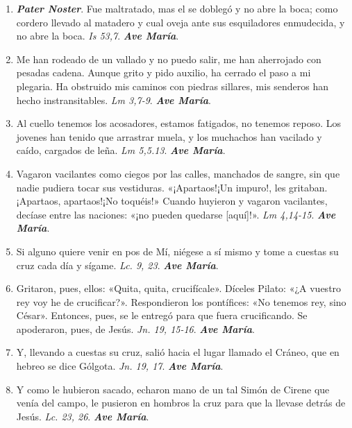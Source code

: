 \documentclass[../../devocionario.tex]{subfiles}
\begin{document}
    \begin{enumerate}
    
        \item \textbf{\textit{Pater Noster}}. Fue maltratado, mas el se doblegó y no abre la boca; como cordero llevado al matadero 
            y cual oveja ante sus esquiladores enmudecida, y no abre la boca. \textit{Is 53,7}. \textbf{\textit{Ave María}}.

        \item Me han rodeado de un vallado y no puedo salir, me han aherrojado con pesadas cadena. Aunque grito y pido auxilio, 
            ha cerrado el paso a mi plegaria. Ha obstruido mis caminos con piedras sillares, 
            mis senderos han hecho instransitables. \textit{Lm 3,7-9}. \textbf{\textit{Ave María}}.

        \item Al cuello tenemos los acosadores, estamos fatigados, no tenemos reposo. Los jovenes han tenido que arrastrar muela, 
            y los muchachos han vacilado y caído, cargados de leña. \textit{Lm 5,5.13}. \textbf{\textit{Ave María}}.

        \item Vagaron vacilantes como ciegos por las calles, manchados de sangre, sin que nadie pudiera tocar sus vestiduras. 
            «¡Apartaos!¡Un impuro!, les gritaban. ¡Apartaos, apartaos!¡No toquéis!» 
            Cuando huyieron y vagaron vacilantes, decíase entre las naciones: «¡no pueden quedarse [aquí]!». \textit{Lm 4,14-15}. \textbf{\textit{Ave María}}.

        \item Si alguno quiere venir en pos de Mí, niégese a sí mismo y tome a cuestas su cruz cada día y sígame. \textit{Lc. 9, 23}. \textbf{\textit{Ave María}}.

        \item Gritaron, pues, ellos: «Quita, quita, crucifícale». Díceles Pilato: «¿A vuestro rey voy he de crucificar?». 
            Respondieron los pontífices: «No tenemos rey, sino César». Entonces, pues, se le entregó para que fuera crucificando. 
            Se apoderaron, pues, de Jesús. \textit{Jn. 19, 15-16}. \textbf{\textit{Ave María}}.

        \item Y, llevando a cuestas su cruz, salió hacia el lugar llamado el Cráneo, que en hebreo se dice Gólgota. \textit{Jn. 19, 17}. \textbf{\textit{Ave María}}.

        \item Y como le hubieron sacado, echaron mano de un tal Simón de Cirene que venía del campo, 
            le pusieron en hombros la cruz para que la llevase detrás de Jesús. \textit{Lc. 23, 26}. \textbf{\textit{Ave María}}.


\end{enumerate}
\end{document}

